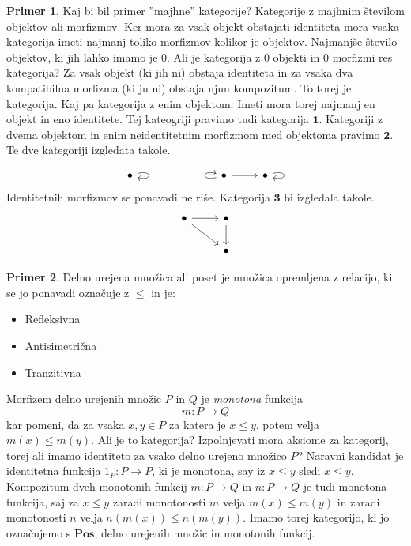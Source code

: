 \documentclass[12pt,a4paper]{book}
\theoremstyle{definition}
\theoremstyle{plain}
\theoremstyle{definition}
\newtheorem{primer}{Primer}[section]
\theoremstyle{remark}
\newcommand{\cat}[1]{\textbf{#1}}
\begin{document}
\begin{primer}
Kaj bi bil primer ''majhne'' kategorije? Kategorije z majhnim številom objektov ali morfizmov. Ker mora za vsak objekt obstajati identiteta mora vsaka kategorija imeti najmanj toliko morfizmov kolikor je objektov. Najmanjše število objektov, ki jih lahko imamo je 0. Ali je kategorija z 0 objekti in 0 morfizmi res kategorija? Za vsak objekt (ki jih ni) obstaja identiteta in za vsaka dva kompatibilna morfizma (ki ju ni) obstaja njun kompozitum. To torej je kategorija. Kaj pa kategorija z enim objektom. Imeti mora torej najmanj en objekt in eno identitete. Tej kateogriji pravimo tudi kategorija $\mathbf{1}$. Kategoriji z dvema objektom in enim neidentitetnim morfizmom med objektoma pravimo $\mathbf{2}$. Te dve kategoriji izgledata takole.

\begin{equation}
\begin{tikzcd}
\bullet \arrow[loop right] &&&  \arrow[loop left] \bullet \arrow[r] & \bullet \arrow[loop right]
\end{tikzcd}
\end{equation}
%
Identitetnih morfizmov se ponavadi ne riše. Kategorija $\cat{3}$ bi izgledala takole.
%
\begin{equation}
\begin{tikzcd}
\bullet \arrow[r] \arrow[rd] & \bullet \arrow[d] \\
& \bullet
\end{tikzcd}
\end{equation}
\end{primer}

\begin{primer}
Delno urejena množica ali poset je množica opremljena z relacijo, ki se jo ponavadi označuje z $\leq$ in je:
\begin{itemize}
\item Refleksivna
\item Antisimetrična
\item Tranzitivna
\end{itemize}
Morfizem delno urejenih množic $P$ in $Q$ je \emph{monotona} funkcija
$$m : P \to Q$$
kar pomeni, da za vsaka $x,y \in P$ za katera je $x \leq y$, potem velja $m(x) \leq m(y)$. Ali je to kategorija? Izpolnjevati mora aksiome za kategorij, torej ali imamo identiteto za vsako delno urejeno množico $P$? Naravni kandidat je identitetna funkcija $1_P : P \to P$, ki je monotona, say iz $x \leq y$ sledi $x \leq y$.
Kompozitum dveh monotonih funkcij $m : P \to Q$ in $n : P \to Q$ je tudi monotona funkcija, saj za $x \leq y$ zaradi monotonosti $m$ velja $m(x) \leq m(y)$ in zaradi monotonosti $n$ velja $n(m(x)) \leq n(m(y))$. Imamo torej kategorijo, ki jo označujemo s $\cat{Pos}$, delno urejenih množic in monotonih funkcij.
\end{primer}
\end{document}
